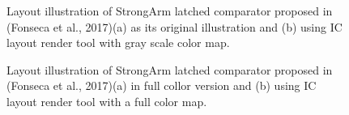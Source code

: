 \documentclass[10pt,a4paper,onecolumn]{article}
\begin{document}
\begin{figure}
 \begin{center}
   \caption{Layout illustration of StrongArm latched comparator proposed in 
   (Fonseca et al., 2017)(a) as its original illustration and (b) using IC layout render tool with gray scale color map.}
 \end{center}
\end{figure}

\begin{figure}
 \begin{center}
   \caption{Layout illustration of StrongArm latched comparator proposed in
(Fonseca et al., 2017)(a) in full collor version and (b) using IC
layout render tool with a full color map.}
 \end{center}
\end{figure}
\end{document}
